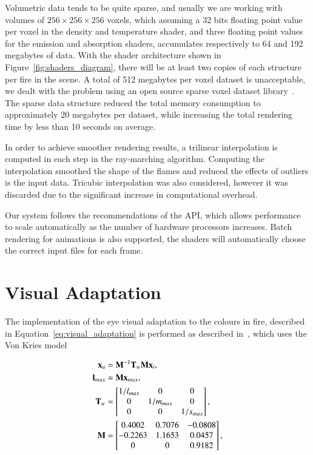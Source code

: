 Volumetric data tends to be quite sparse, and usually we are working with volumes of $256 \times 256 \times 256$ voxels, which assuming a 32 bits floating point value per voxel in the density and temperature shader, and three floating point values for the emission and absorption shaders, accumulates respectively to 64 and 192 megabytes of data.
With the shader architecture shown in Figure~\ref{fig:shaders_diagram}, there will be at least two copies of each structure per fire in the scene.
A total of 512 megabytes per voxel dataset is unacceptable, we dealt with the problem using an open source sparse voxel dataset library~\cite{OpenVDB}.
The sparse data structure reduced the total memory consumption to approximately 20 megabytes per dataset, while increasing the total rendering time by less than 10 seconds on average.

In order to achieve smoother rendering results, a trilinear interpolation is computed in each step in the ray-marching algorithm.
Computing the interpolation smoothed the shape of the flames and reduced the effects of outliers is the input data.
Tricubic interpolation was also considered, however it was discarded due to the significant increase in computational overhead.

Our system follows the recommendations of the \MentalRay API, which allows performance to scale automatically as the number of hardware processors increases.
Batch rendering for animations is also supported, the shaders will automatically choose the correct input files for each frame. 

\section{Visual Adaptation}
\label{sec:visual_adaptation_imp}

The implementation of the eye visual adaptation to the colours in fire, described in Equation~\ref{eq:visual_adaptation} is performed as described in~\cite{Nguyen:2002}, which uses the Von Kries model~\cite{Fairchild:2005} 

\begin{equation}
\begin{split}
\mathbf{x}_a &= \mathbf{M}^{-1} \mathbf{T}_w \mathbf{M} \mathbf{x}_i, \\
\mathbf{l}_{max} &= \mathbf{M} \mathbf{x}_{max}, \\
\mathbf{T}_w &= 
\begin{bmatrix}
1 / l_{max} & 0 & 0\\
0 & 1 / m_{max} & 0\\
0 & 0 & 1 / s_{max}\\
\end{bmatrix}, \\
\mathbf{M} &= 
\begin{bmatrix}
0.4002 & 0.7076 & -0.0808\\
-0.2263 & 1.1653 & 0.0457\\
0 & 0 & 0.9182\\
\end{bmatrix},
\end{split}
\end{equation}

